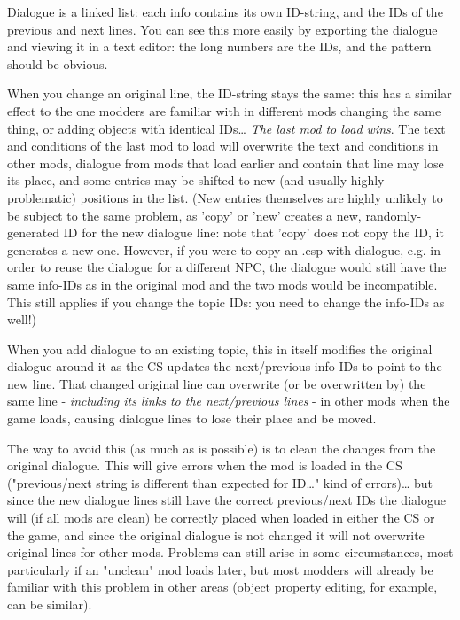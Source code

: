 Dialogue is a linked list: each info contains its own ID-string, and the
IDs of the previous and next lines. You can see this more easily by
exporting the dialogue and viewing it in a text editor: the long numbers
are the IDs, and the pattern should be obvious.

When you change an original line, the ID-string stays the same: this has
a similar effect to the one modders are familiar with in different mods
changing the same thing, or adding objects with identical IDs\ldots{}
\emph{The last mod to load wins}. The text and conditions of the last
mod to load will overwrite the text and conditions in other mods,
dialogue from mods that load earlier and contain that line may lose its
place, and some entries may be shifted to new (and usually highly
problematic) positions in the list. (New entries themselves are highly
unlikely to be subject to the same problem, as 'copy' or 'new' creates a
new, randomly-generated ID for the new dialogue line: note that 'copy'
does not copy the ID, it generates a new one. However, if you were to
copy an .esp with dialogue, e.g. in order to reuse the dialogue for a
different NPC, the dialogue would still have the same info-IDs as in the
original mod and the two mods would be incompatible. This still applies
if you change the topic IDs: you need to change the info-IDs as well!)

When you add dialogue to an existing topic, this in itself modifies the
original dialogue around it as the CS updates the next/previous info-IDs
to point to the new line. That changed original line can overwrite (or
be overwritten by) the same line - \emph{including its links to the
next/previous lines} - in other mods when the game loads, causing
dialogue lines to lose their place and be moved.

The way to avoid this (as much as is possible) is to clean the changes
from the original dialogue. This will give errors when the mod is loaded
in the CS ("previous/next string is different than expected for
ID\ldots" kind of errors)\ldots{} but since the new dialogue lines still
have the correct previous/next IDs the dialogue will (if all mods are
clean) be correctly placed when loaded in either the CS or the game, and
since the original dialogue is not changed it will not overwrite
original lines for other mods. Problems can still arise in some
circumstances, most particularly if an "unclean" mod loads later, but
most modders will already be familiar with this problem in other areas
(object property editing, for example, can be similar).

